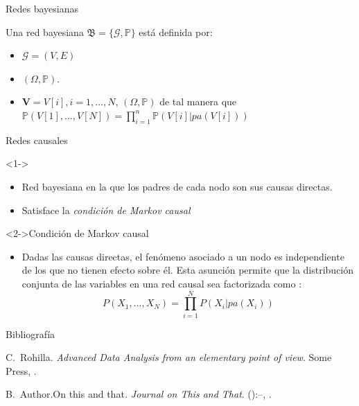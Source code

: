 \documentclass{beamer}
\begin{document}
\begin{frame}{Redes bayesianas}
    \begin{definition} 
        Una red bayesiana $\mathfrak{B} = \lbrace \mathcal{G}, \mathbb{P} \rbrace$ está definida por:
        \begin{itemize}
            \item $\mathcal{G}=(V,E)$ 
            \item $(\Omega, \mathbb{P})$.
            \item $\textbf{V}=V[i], i=1,...,N$, $(\Omega, \mathbb{P})$ 
            de tal manera que $\mathbb{P}(V[1],...,V[N])= \prod_{i=1}^{n}\mathbb{P}(V[i]|pa(V[i]))$
        \end{itemize}
    \end{definition}     
\end{frame}

\begin{frame}{Redes causales}
   \begin{block}
        <1->{}
            \begin{itemize}
                \item Red bayesiana en la que los padres de cada nodo son sus causas directas.
                \item Satisface la {\em condición de Markov causal}
            \end{itemize}
    \end{block}
    \begin{exampleblock}
        <2->{Condición de Markov causal}
            \begin{itemize}
                \item Dadas las causas directas, el fenómeno asociado a un nodo es independiente de 
                los que no tienen efecto sobre él. Esta asunción permite que la distribución 
                conjunta de las variables en una red causal sea factorizada como :
                $$ P(X_{1}, \dots,X_{N}) = \prod_{i=1}^{N} P(X_{i} | pa(X_{i}))$$ 
            \end{itemize}
    \end{exampleblock}
\end{frame}

\begin{frame}{Bibliografía}
	\begin{thebibliography}{2}
		\beamertemplatebookbibitems
		C.\ Rohilla. \newblock\emph{Advanced Data Analysis from an elementary point of view}.\newblock
\textlatin{Some Press, }.

		\beamertemplatearticlebibitems
		B.\ Author.\newblock On this and that\emph{.}
\newblock\emph{Journal on This and That}. 
():--, 
.
	\end{thebibliography}
\end{frame}

\end{document}
